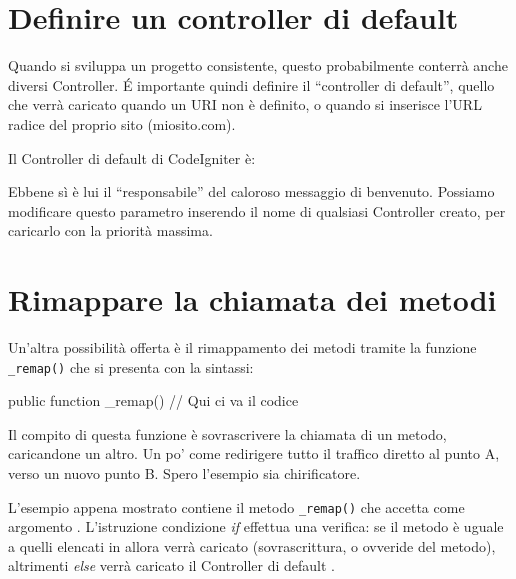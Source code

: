\section{Definire un controller di default}
Quando si sviluppa un progetto consistente, questo probabilmente conterrà anche diversi Controller. \'E importante quindi definire il ``controller di default'', quello che verrà caricato quando un \ac{URI} non è definito, o quando si inserisce l'\ac{URL} radice del proprio sito (miosito.com).

Il Controller di default di CodeIgniter è:


Ebbene sì è lui il ``responsabile'' del caloroso messaggio di benvenuto. Possiamo modificare questo parametro inserendo il nome di qualsiasi Controller creato, per caricarlo con la priorità massima.

\section{Rimappare la chiamata dei metodi}
Un'altra possibilità offerta è il rimappamento dei metodi tramite la funzione \verb|_remap()| che si presenta con la sintassi:

\begin{code}
public function _remap()
{
    // Qui ci va il codice
}
\end{code}

Il compito di questa funzione è sovrascrivere la chiamata di un metodo, caricandone un altro. Un po' come redirigere tutto il traffico diretto al punto A, verso un nuovo punto B. Spero l'esempio sia chirificatore.


L'esempio appena mostrato contiene il metodo \verb|_remap()| che accetta come argomento . L'istruzione condizione \emph{if} effettua una verifica: se il metodo  è uguale a quelli elencati in  allora verrà caricato  (sovrascrittura, o ovveride del metodo), altrimenti \emph{else} verrà caricato il Controller di default .

